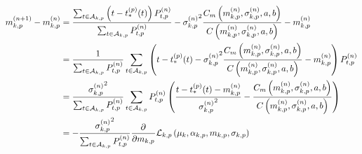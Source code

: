 \begin{equation}
    \begin{split}
        m_{k,p}^{(n+1)} - m_{k,p}^{(n)} &=\frac{\sum_{t\in\mathcal{A}_{k,p}} \left( t - t_*^{(p)}(t) \right) P_{t,p}^{(n)}}{\sum_{t\in\mathcal{A}_{k,p}} P_{t,p}^{(n)}} - {\sigma_{k,p}^{(n)}}^2 \frac{C_m\left( m_{k,p}^{(n)}, \sigma_{k,p}^{(n)},a,b \right)}{C\left( m_{k,p}^{(n)}, \sigma_{k,p}^{(n)},a,b \right)} - m_{k,p}^{(n)} \\
        &= \frac{1}{\sum_{t\in\mathcal{A}_{k,p}} P_{t,p}^{(n)}}\sum_{t\in\mathcal{A}_{k,p}} \left( t - t_*^{(p)}(t) - {\sigma_{k,p}^{(n)}}^2 \frac{C_m\left( m_{k,p}^{(n)}, \sigma_{k,p}^{(n)},a,b \right)}{C\left( m_{k,p}^{(n)}, \sigma_{k,p}^{(n)},a,b \right)} - m_{k,p}^{(n)} \right) P_{t,p}^{(n)} \\
        &= \frac{{\sigma_{k,p}^{(n)}}^2}{\sum_{t\in\mathcal{A}_{k,p}} P_{t,p}^{(n)}} \sum_{t\in\mathcal{A}_{k,p}} P_{t,p}^{(n)} \left( \frac{t - t_*^{(p)}(t) - m_{k,p}^{(n)}}{{\sigma_{k,p}^{(n)}}^2} - \frac{C_m\left( m_{k,p}^{(n)}, \sigma_{k,p}^{(n)},a,b \right)}{C\left( m_{k,p}^{(n)}, \sigma_{k,p}^{(n)},a,b \right)} \right) \\
        &= - \frac{{\sigma_{k,p}^{(n)}}^2}{\sum_{t\in\mathcal{A}_{k,p}} P_{t,p}^{(n)}} \frac{\partial^{}}{\partial {m_{k,p}}^{}}\mathcal{L}_{k,p}\left( \mu_k, \alpha_{k,p}, m_{k,p}, \sigma_{k,p} \right)
    \end{split}
\end{equation}